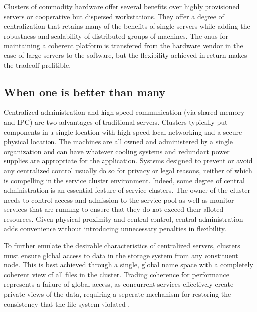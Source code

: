 Clusters of commodity hardware offer several benefits over highly provisioned servers or cooperative but dispersed workstations. They offer a degree of centralization that retains many of the benefits of single servers while adding the robustness and scalability of distributed groups of machines. The onus for maintaining a coherent platform is transfered from the hardware vendor in the case of large servers to the software, but the flexibility achieved in return makes the tradeoff profitible.

\subsection{When one is better than many}

Centralized administration and high-speed communication (via shared memory and IPC) are two advantages of traditional servers. Clusters typically put components in a single location with high-speed local networking and a secure physical location. The machines are all owned and administered by a single organization and can have whatever cooling systems and redundant power supplies are appropriate for the application. Systems designed to prevent or avoid any centralized control usually do so for privacy or legal reasons, neither of which is compelling in the service cluster environment. Indeed, some degree of central administration is an essential feature of service clusters. The owner of the cluster needs to control access and admission to the service pool as well as monitor services that are running to ensure that they do not exceed their alloted resources. Given physical proximity and central control, central administration adds convenience without introducing unnecessary penalties in flexibility.

To further emulate the desirable characteristics of centralized servers, clusters must ensure global access to data in the storage system from any constituent node. This is best achieved through a single, global name space with a completely coherent view of all files in the cluster. Trading coherence for performance represents a failure of global access, as concurrent services effectively create private views of the data, requiring a seperate mechanism for restoring the consistency that the file system violated \cite{birrell93}.

